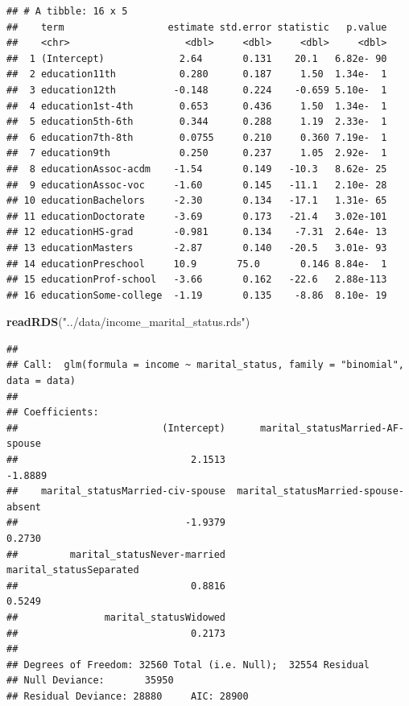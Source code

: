 \documentclass[]{article}
\newenvironment{Shaded}{\begin{snugshade}}{\end{snugshade}}
\newcommand{\KeywordTok}[1]{\textcolor[rgb]{0.13,0.29,0.53}{\textbf{#1}}}
\newcommand{\NormalTok}[1]{#1}
\newcommand{\StringTok}[1]{\textcolor[rgb]{0.31,0.60,0.02}{#1}}
\begin{document}
\begin{verbatim}
## # A tibble: 16 x 5
##    term                  estimate std.error statistic   p.value
##    <chr>                    <dbl>     <dbl>     <dbl>     <dbl>
##  1 (Intercept)             2.64       0.131    20.1   6.82e- 90
##  2 education11th           0.280      0.187     1.50  1.34e-  1
##  3 education12th          -0.148      0.224    -0.659 5.10e-  1
##  4 education1st-4th        0.653      0.436     1.50  1.34e-  1
##  5 education5th-6th        0.344      0.288     1.19  2.33e-  1
##  6 education7th-8th        0.0755     0.210     0.360 7.19e-  1
##  7 education9th            0.250      0.237     1.05  2.92e-  1
##  8 educationAssoc-acdm    -1.54       0.149   -10.3   8.62e- 25
##  9 educationAssoc-voc     -1.60       0.145   -11.1   2.10e- 28
## 10 educationBachelors     -2.30       0.134   -17.1   1.31e- 65
## 11 educationDoctorate     -3.69       0.173   -21.4   3.02e-101
## 12 educationHS-grad       -0.981      0.134    -7.31  2.64e- 13
## 13 educationMasters       -2.87       0.140   -20.5   3.01e- 93
## 14 educationPreschool     10.9       75.0       0.146 8.84e-  1
## 15 educationProf-school   -3.66       0.162   -22.6   2.88e-113
## 16 educationSome-college  -1.19       0.135    -8.86  8.10e- 19
\end{verbatim}

\begin{Shaded}
\begin{Highlighting}[]
\KeywordTok{readRDS}\NormalTok{(}\StringTok{"../data/income\_marital\_status.rds"}\NormalTok{)}
\end{Highlighting}
\end{Shaded}

\begin{verbatim}
## 
## Call:  glm(formula = income ~ marital_status, family = "binomial", data = data)
## 
## Coefficients:
##                         (Intercept)      marital_statusMarried-AF-spouse  
##                              2.1513                              -1.8889  
##    marital_statusMarried-civ-spouse  marital_statusMarried-spouse-absent  
##                             -1.9379                               0.2730  
##         marital_statusNever-married              marital_statusSeparated  
##                              0.8816                               0.5249  
##               marital_statusWidowed  
##                              0.2173  
## 
## Degrees of Freedom: 32560 Total (i.e. Null);  32554 Residual
## Null Deviance:       35950 
## Residual Deviance: 28880     AIC: 28900
\end{verbatim}
\end{document}

